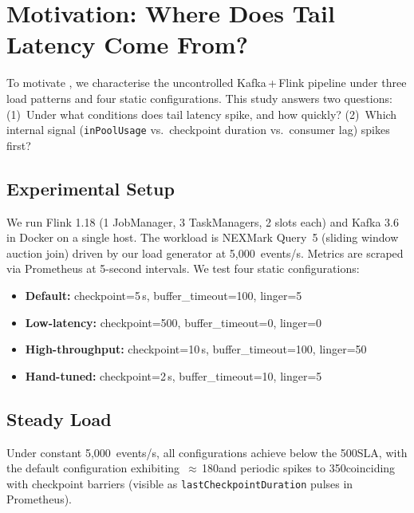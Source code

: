 \section{Motivation: Where Does Tail Latency Come From?}
\label{sec:motivation}

To motivate \xtal, we characterise the uncontrolled Kafka\,+\,Flink
pipeline under three load patterns and four static configurations.
This study answers two questions:
(1)~Under what conditions does tail latency spike, and how quickly?
(2)~Which internal signal (\texttt{inPoolUsage} vs.\
checkpoint duration vs.\ consumer lag) spikes first?

\subsection{Experimental Setup}
We run Flink 1.18 (1 JobManager, 3 TaskManagers, 2 slots each) and
Kafka 3.6 in Docker on a single host.
The workload is NEXMark Query~5 (sliding window auction join) driven
by our load generator at 5{,}000~events/s.
Metrics are scraped via Prometheus at 5-second intervals.
We test four static configurations:
\begin{itemize}
  \item \textbf{Default:} checkpoint=5\,s, buffer\_timeout=100\ms, linger=5\ms
  \item \textbf{Low-latency:} checkpoint=500\ms, buffer\_timeout=0\ms, linger=0\ms
  \item \textbf{High-throughput:} checkpoint=10\,s, buffer\_timeout=100\ms, linger=50\ms
  \item \textbf{Hand-tuned:} checkpoint=2\,s, buffer\_timeout=10\ms, linger=5\ms
\end{itemize}

\subsection{Steady Load}
Under constant 5{,}000~events/s, all configurations achieve 
below the 500\ms SLA, with the default configuration exhibiting
\pnn{99}\,$\approx$\,180\ms and periodic spikes to 350\ms coinciding
with checkpoint barriers (visible as \texttt{lastCheckpointDuration}
pulses in Prometheus).


